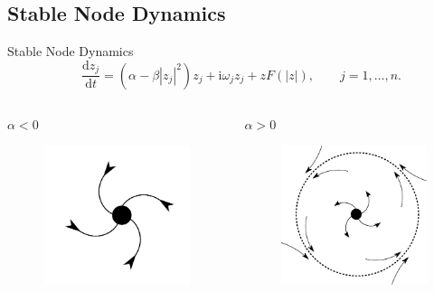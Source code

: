 \documentclass[10pt,reqno]{beamer}
\newcommand{\D}[2]{\frac{\mathrm{d} #1}{\mathrm{d} #2}}
\newcommand{\I}{\mathrm{i}}
\begin{document}
\subsection{Stable Node Dynamics}
\begin{frame}{Stable Node Dynamics}
\[
\quad \D{z_j}{t} = (\alpha - \beta|z_j|^2)z_j + \I\omega_jz_j +zF(|z|), \qquad j = 1,\ldots, n.
\]
\vfill
\begin{columns}
\begin{column}{.49\textwidth}
\begin{tcolorbox}[notitle, boxrule=1pt, colback=white]
\centering $\alpha <0$
\begin{figure}
\includegraphics[scale = 0.16]{node.png}
\end{figure}
\end{tcolorbox}
\end{column}
\begin{column}{.49\textwidth}
\centering
$\alpha >0$
\begin{figure}
\includegraphics[scale = 0.16]{hopf.png}

\end{figure}
\end{column}
\end{columns}
\end{frame}
\end{document}
